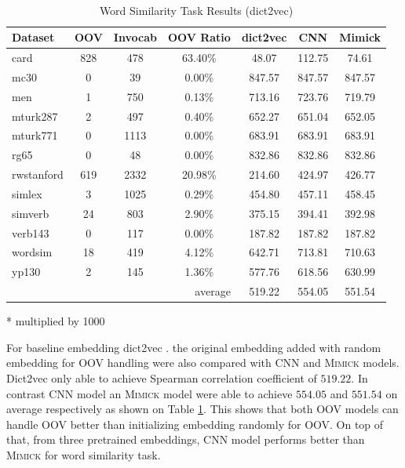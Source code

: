     \begin{table}[!ht]
      \begin{threeparttable} 
      \begin{center}
        \caption{Word Similarity Task Results (dict2vec)}
        ~\\
        \label{tab:wordsim:dict2vec}
        \begin{tabular}{l|c|c|c|c|c|c}
          \textbf{Dataset} & \textbf{OOV} & \textbf{Invocab} &
          \textbf{OOV Ratio} & \textbf{dict2vec}\tnote{*} &
          \textbf{CNN}\tnote{*} & \textbf{Mimick}\tnote{*}\\
          \hline
          card & 828 & 478 & 63.40\% & 48.07 & 112.75 & 74.61\\
          mc30 & 0 & 39 & 0.00\% & 847.57 & 847.57 & 847.57\\
          men & 1 & 750 & 0.13\% & 713.16 & 723.76 & 719.79\\
          mturk287 & 2 & 497 & 0.40\% & 652.27 & 651.04 & 652.05\\
          mturk771 & 0 & 1113 & 0.00\% & 683.91 & 683.91 & 683.91\\
          rg65 & 0 & 48 & 0.00\% & 832.86 & 832.86 & 832.86\\
          rwstanford & 619 & 2332 & 20.98\% & 214.60 & 424.97 & 426.77\\
          simlex & 3 & 1025 & 0.29\% & 454.80 & 457.11 & 458.45\\
          simverb & 24 & 803 & 2.90\% & 375.15 & 394.41 & 392.98\\
          verb143 & 0 & 117 & 0.00\% & 187.82 & 187.82 & 187.82\\
          wordsim & 18 & 419 & 4.12\% & 642.71 & 713.81 & 710.63\\
          yp130 & 2 & 145 & 1.36\% & 577.76 & 618.56 & 630.99\\
          \hline
          \multicolumn{4}{r|}{average} & 519.22 & 554.05 & 551.54\\
        \end{tabular}
        \begin{tablenotes}
          \item[*] multiplied by 1000
        \end{tablenotes}
      \end{center}
    \end{threeparttable} 
    \end{table}

    For baseline embedding dict2vec \citep{dict2vect2017tissier}. the
    original embedding added with random embedding for OOV handling
    were also compared with CNN and \textsc{Mimick} models. Dict2vec
    only able to achieve Spearman correlation coefficient of $519.22$.
    In contrast CNN model an \textsc{Mimick} model were able to
    achieve $554.05$ and $551.54$ on average respectively as shown on
    Table \ref{tab:wordsim:dict2vec}. This shows that both OOV models
    can handle OOV better than initializing embedding randomly for
    OOV. On top of that, from three pretrained embeddings, CNN model
    performs better than \textsc{Mimick} for word similarity task.